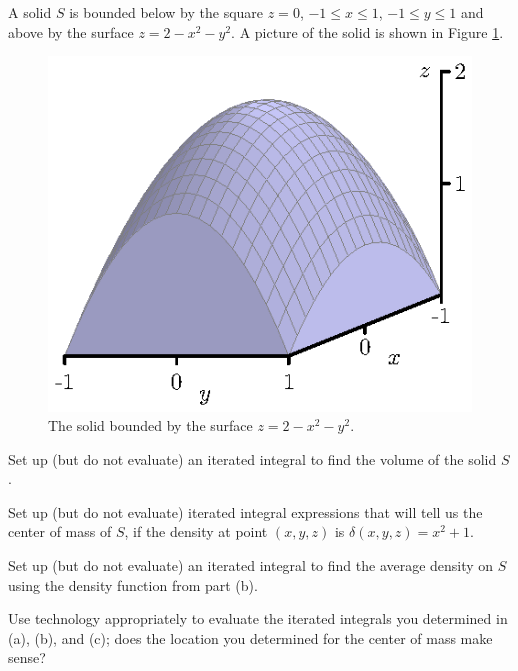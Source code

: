 \begin{activity} \label{A:11.7.6} A solid $S$ is bounded below by the square $z=0$, $-1 \leq x \leq 1$, $-1 \leq y \leq 1$ and above by the surface $z = 2-x^2-y^2$. A picture of the solid is shown in Figure \ref{F:11.7.COM3D}.
\begin{figure}[ht]
\begin{center}
  \includegraphics{figures/fig_11_7_volume.eps}
\end{center}
\caption{The solid bounded by the surface $z = 2-x^2-y^2$.}
\label{F:11.7.COM3D}
\end{figure}

    \ba
    \item Set up (but do not evaluate) an iterated integral to find the volume of the solid $S$.

    \item Set up (but do not evaluate) iterated integral expressions that will tell us the center of mass of $S$, if the density at point $(x,y,z)$ is $\delta(x,y,z)=x^2+1$.

    \item Set up (but do not evaluate) an iterated integral to find the average density on $S$ using the density function from part (b).

    \item Use technology appropriately to evaluate the iterated integrals you determined in (a), (b), and (c); does the location you determined for the center of mass make sense?

    \ea

\end{activity}
